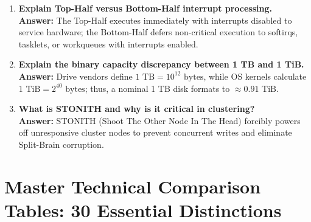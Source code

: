 \begin{enumerate}[label=\textbf{Q\arabic*.},leftmargin=1.2cm]
\item \textbf{Explain Top-Half versus Bottom-Half interrupt processing.} \\
\textbf{Answer:} The Top-Half executes immediately with interrupts disabled to service hardware; the Bottom-Half defers non-critical execution to softirqs, tasklets, or workqueues with interrupts enabled.

\item \textbf{Explain the binary capacity discrepancy between 1 TB and 1 TiB.} \\
\textbf{Answer:} Drive vendors define $1\text{ TB} = 10^{12}\text{ bytes}$, while OS kernels calculate $1\text{ TiB} = 2^{40}\text{ bytes}$; thus, a nominal 1 TB disk formats to $\approx 0.91\text{ TiB}$.

\item \textbf{What is STONITH and why is it critical in clustering?} \\
\textbf{Answer:} STONITH (Shoot The Other Node In The Head) forcibly powers off unresponsive cluster nodes to prevent concurrent writes and eliminate Split-Brain corruption.
\end{enumerate}

\section{Master Technical Comparison Tables: 30 Essential Distinctions}
\label{sec:os_master_comparison_tables}


